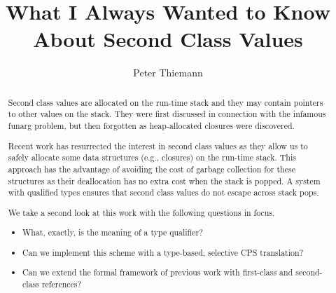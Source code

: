 \documentclass[sigplan,review,dvipsnames,screen,10pt]{acmart}
\begin{document}
\title{What I Always Wanted to Know About Second Class Values}

\author{Peter Thiemann}

\begin{abstract}
Second class values are allocated on the run-time stack and they may contain pointers
to other values on the stack. They were first discussed in connection with the
infamous funarg problem, but then forgotten as heap-allocated closures were
discovered.

Recent work has resurrected the interest in second class values as they allow us
to safely allocate some data structures (e.g., closures) on the run-time stack.
This approach has the advantage of avoiding the cost of garbage collection for
these structures as their deallocation has no extra cost when the stack is popped.
A system with qualified types ensures that second class values do not
escape across stack pops.

We take a second look at this work with the following questions in focus.

\begin{itemize}
\item What, exactly, is the meaning of a type qualifier?  
\item Can we implement this scheme with a type-based, selective CPS
  translation?
\item Can we extend the formal framework of previous work
  with first-class and second-class references?
\end{itemize}
\end{abstract}

\end{document}
